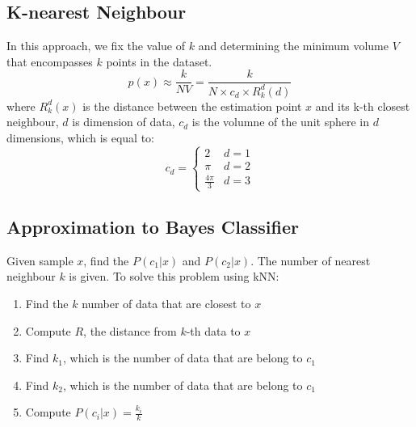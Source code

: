 \begin{multicols*}{2}
\section{K-nearest Neighbour}

\noindent In this approach, we fix the value of $k$ and determining the minimum volume $V$ that encompasses $k$ points in the dataset. 
$$p(x)\approx \frac{k}{NV} = \frac{k}{N \times c_d \times R_k^d (d)}$$
\noindent where $R_k^d(x)$ is the distance between the estimation point $x$ and its k-th closest neighbour, $d$ is dimension of data, $c_d$ is the volumne of the unit sphere in $d$ dimensions, which is equal to:
$$
c_d = 
\begin{cases}
2 & d=1 \\
\pi & d=2 \\
\frac{4\pi}{3} & d=3
\end{cases}
$$

\subsection{Approximation to Bayes Classifier}

\noindent Given sample $x$, find the $P(c_1|x)$ and $P(c_2|x)$. The number of nearest neighbour $k$ is given. To solve this problem using kNN:

\begin{enumerate}
    \item Find the $k$ number of data that are closest to $x$
    \item Compute $R$, the distance from $k$-th data to $x$
    \item Find $k_1$, which is the number of data that are belong to $c_1$
    \item Find $k_2$, which is the number of data that are belong to $c_1$
    \item Compute $P(c_i|x) = \frac{k_i}{k}$
\end{enumerate}

\end{multicols*}
